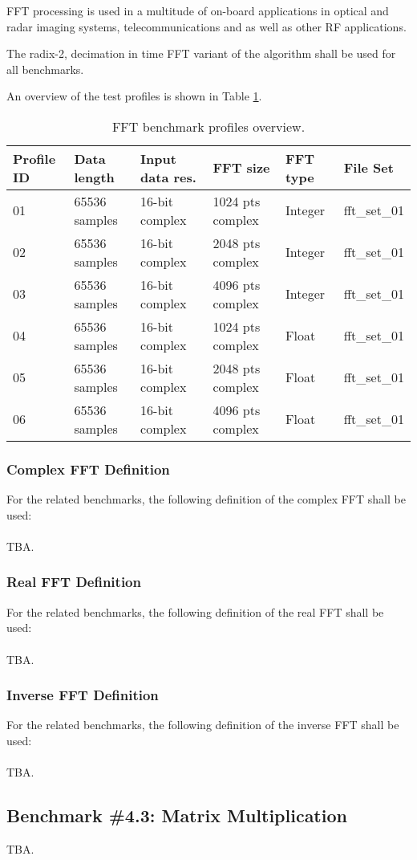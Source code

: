 FFT processing is used in a multitude of on-board applications in optical and radar imaging systems, telecommunications and as well as other RF applications.

The radix-2, decimation in time FFT variant of the algorithm shall be used for all benchmarks.

An overview of the test profiles is shown in Table \ref{tab:fft_profiles}. 

	
\begin{table}[!h]
\centering
\begin{tabular}{|l|l|l|l|l|l|}
    \hline
    Profile ID  & Data length     & Input data res. & FFT size          & FFT type      & File Set      \\ \hline 
    \hline
    01	        & 65536 samples	  & 16-bit complex  & 1024 pts complex   & Integer      & fft\_set\_01  \\ \hline
    02	        & 65536 samples	  & 16-bit complex  & 2048 pts complex   & Integer      & fft\_set\_01  \\ \hline
    03	        & 65536 samples	  & 16-bit complex  & 4096 pts complex   & Integer      & fft\_set\_01  \\ \hline
    04	        & 65536 samples	  & 16-bit complex  & 1024 pts complex   & Float        & fft\_set\_01  \\ \hline
    05	        & 65536 samples	  & 16-bit complex  & 2048 pts complex   & Float        & fft\_set\_01  \\ \hline
    06	        & 65536 samples	  & 16-bit complex  & 4096 pts complex   & Float        & fft\_set\_01  \\ \hline
\end{tabular}
\caption{FFT benchmark profiles overview.}
\label{tab:fft_profiles}
\end{table}
	
\subsubsection{Complex FFT Definition}
For the related benchmarks, the following definition of the complex FFT shall be used:\\
\\
TBA.

\subsubsection{Real FFT Definition}
For the related benchmarks, the following definition of the real FFT shall be used:\\
\\
TBA.

\subsubsection{Inverse FFT Definition}
For the related benchmarks, the following definition of the inverse FFT shall be used:\\
\\
TBA.
	
\subsection{Benchmark \#4.3: Matrix Multiplication}
TBA.

